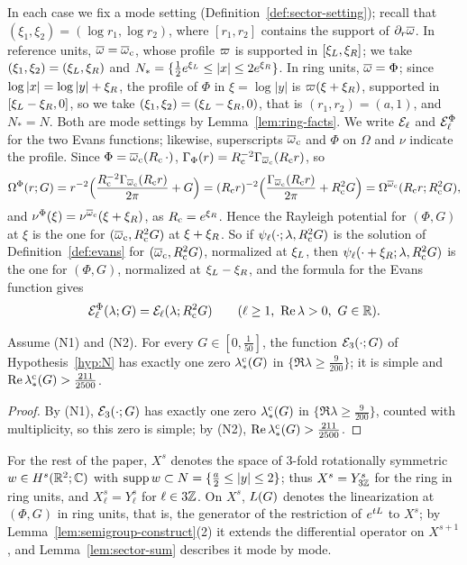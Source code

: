 In each case we fix a mode setting (Definition~\ref{def:sector-setting}); recall
that $(\xi_1,\xi_2)=(\log r_1,\log r_2)$, where $[r_1,r_2]$ contains the support of
$\partial_r\overline{\omega}$. In reference units, $\overline{\omega}=\overline{\omega}_{\mathrm{c}}$, whose profile $\varpi$ is
supported in $[\xi_L,\xi_R]$; we take $(\xi_1,\xi_2)=(\xi_L,\xi_R)$ and
$N_*=\{\frac12e^{\xi_L}\le|x|\le2e^{\xi_R}\}$. In ring units, $\overline{\omega}=\Phi$; since
$\log|x|=\log|y|+\xi_R$, the profile of $\Phi$ in $\xi=\log|y|$ is
$\varpi(\xi+\xi_R)$, supported in $[\xi_L-\xi_R,0]$, so we take
$(\xi_1,\xi_2)=(\xi_L-\xi_R,0)$, that is $(r_1,r_2)=(a,1)$, and $N_*=N$. Both are
mode settings by Lemma~\ref{lem:ring-facts}. We write $\mathcal{E}_\ell$ and $\mathcal{E}^\Phi_\ell$
for the two Evans functions; likewise, superscripts $\overline{\omega}_{\mathrm{c}}$ and $\Phi$ on $\Omega$
and $\nu$ indicate the profile. Since $\Phi=\overline{\omega}_{\mathrm{c}}(R_{\mathrm{c}}\,\cdot)$,
$\Gamma_\Phi(r)=R_{\mathrm{c}}^{-2}\Gamma_{\overline{\omega}_{\mathrm{c}}}(R_{\mathrm{c}} r)$, so
\[
\Omega^\Phi(r;G)=r^{-2}\Big(\frac{R_{\mathrm{c}}^{-2}\Gamma_{\overline{\omega}_{\mathrm{c}}}(R_{\mathrm{c}} r)}{2\pi}+G\Big)
=(R_{\mathrm{c}} r)^{-2}\Big(\frac{\Gamma_{\overline{\omega}_{\mathrm{c}}}(R_{\mathrm{c}} r)}{2\pi}+R_{\mathrm{c}}^2G\Big)=\Omega^{\overline{\omega}_{\mathrm{c}}}(R_{\mathrm{c}} r;R_{\mathrm{c}}^2G),
\]
and $\nu^\Phi(\xi)=\nu^{\overline{\omega}_{\mathrm{c}}}(\xi+\xi_R)$, as $R_{\mathrm{c}}=e^{\xi_R}$. Hence the Rayleigh
potential for $(\Phi,G)$ at $\xi$ is the one for $(\overline{\omega}_{\mathrm{c}},R_{\mathrm{c}}^2G)$ at $\xi+\xi_R$. So
if $\psi_\ell(\cdot;\lambda,R_{\mathrm{c}}^2G)$ is the solution of Definition~\ref{def:evans}
for $(\overline{\omega}_{\mathrm{c}},R_{\mathrm{c}}^2G)$, normalized at $\xi_L$, then $\psi_\ell(\cdot+\xi_R;\lambda,R_{\mathrm{c}}^2G)$
is the one for $(\Phi,G)$, normalized at $\xi_L-\xi_R$, and the formula for the Evans
function gives
\begin{equation}
\label{eq:evans-units}
\Evans^\Phi_\ell(\lambda;G)=\Evans_\ell(\lambda;\Rc^2G)\qquad(\ell\ge1,\ \Re\lambda>0,\ G\in\R).
\end{equation}

\begin{corollary}
\label{cor:sector-3}
Assume \textup{(N1)} and \textup{(N2)}. For every $G\in[0,\frac1{50}]$, the
function $\mathcal{E}_3(\cdot;G)$ of Hypothesis~\ref{hyp:N} has exactly one zero
$\lambda_*^{\mathrm c}(G)$ in $\{\Re\lambda\ge\frac9{200}\}$; it is simple and
$\Re\lambda_*^{\mathrm c}(G)>\frac{211}{2500}$.
\end{corollary}
\begin{proof}
By (N1), $\mathcal{E}_3(\cdot;G)$ has exactly one zero $\lambda_*^{\mathrm c}(G)$ in
$\{\Re\lambda\ge\frac9{200}\}$, counted with multiplicity, so this zero is simple; by (N2),
$\Re\lambda_*^{\mathrm c}(G)>\frac{211}{2500}$.
\end{proof}

For the rest of the paper, $X^s$ denotes the space of $3$-fold rotationally symmetric
$w\in H^s(\mathbb{R}^2;\mathbb{C})$ with $\operatorname{supp} w\subset N=\{\frac a2\le|y|\le2\}$; thus
$X^s=Y^s_{3\mathbb{Z}}$ for the ring in ring units, and $X^s_\ell=Y^s_\ell$ for $\ell\in3\mathbb{Z}$.
On $X^s$, $L(G)$ denotes the linearization at $(\Phi,G)$ in ring units, that is,
the generator of the restriction of $e^{tL}$ to $X^s$; by
Lemma~\ref{lem:semigroup-construct}(2) it extends the differential operator on
$X^{s+1}$, and Lemma~\ref{lem:sector-sum} describes it mode by mode.

